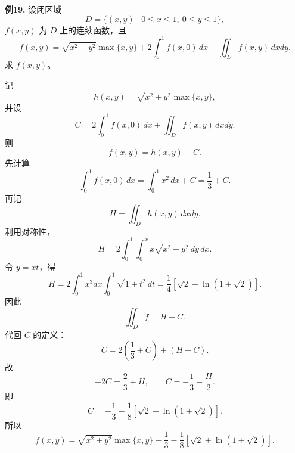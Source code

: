 \begin{problemblock}
\textbf{例19.} 设闭区域
\[
D=\{(x,y)\mid0\le x\le1,\ 0\le y\le1\},
\]
\(f(x,y)\) 为 \(D\) 上的连续函数，且
\[
f(x,y)=\sqrt{x^2+y^2}\max\{x,y\}
+2\int_0^1f(x,0)\,dx+\iint_Df(x,y)\,dxdy.
\]
求 \(f(x,y)\)。
\end{problemblock}
\begin{solutionblock}
记
\[
h(x,y)=\sqrt{x^2+y^2}\max\{x,y\},
\]
并设
\[
C=2\int_0^1f(x,0)\,dx+\iint_Df(x,y)\,dxdy.
\]
则
\[
f(x,y)=h(x,y)+C.
\]
先计算
\[
\int_0^1 f(x,0)\,dx
=\int_0^1 x^2\,dx+C=\frac13+C.
\]
再记
\[
H=\iint_D h(x,y)\,dxdy.
\]
利用对称性，
\[
H=2\int_0^1\int_0^x x\sqrt{x^2+y^2}\,dy\,dx.
\]
令 \(y=xt\)，得
\[
H=2\int_0^1x^3dx\int_0^1\sqrt{1+t^2}\,dt
=\frac14\left[\sqrt2+\ln(1+\sqrt2)\right].
\]
因此
\[
\iint_Df=H+C.
\]
代回 \(C\) 的定义：
\[
C=2\left(\frac13+C\right)+(H+C).
\]
故
\[
-2C=\frac23+H,
\qquad
C=-\frac13-\frac H2.
\]
即
\[
C=-\frac13-\frac18\left[\sqrt2+\ln(1+\sqrt2)\right].
\]
所以
\[
f(x,y)=\sqrt{x^2+y^2}\max\{x,y\}
-\frac13-\frac18\left[\sqrt2+\ln(1+\sqrt2)\right].
\]
\end{solutionblock}
